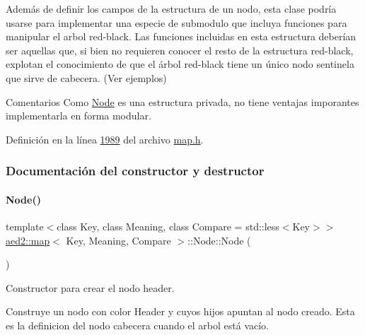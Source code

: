 Además de definir los campos de la estructura de un nodo, esta clase podría usarse para implementar una especie de submodulo que incluya funciones para manipular el arbol red-\/black. Las funciones incluidas en esta estructura deberían ser aquellas que, si bien no requieren conocer el resto de la estructura red-\/black, explotan el conocimiento de que el árbol red-\/black tiene un único nodo sentinela que sirve de cabecera. (Ver ejemplos)

\begin{DoxyRemark}{Comentarios}
Como \hyperlink{structaed2_1_1map_1_1Node}{Node} es una estructura privada, no tiene ventajas imporantes implementarla en forma modular. 
\end{DoxyRemark}


Definición en la línea \hyperlink{map_8h_source_l01989}{1989} del archivo \hyperlink{map_8h_source}{map.\+h}.



\subsubsection{Documentación del constructor y destructor}
\mbox{\label{structaed2_1_1map_1_1Node_a9c1a600491066ce7eb669b1cb76d56c6_a9c1a600491066ce7eb669b1cb76d56c6}} 
\paragraph{\texorpdfstring{Node()}{Node()}\hspace{0.1cm}{\footnotesize\ttfamily [1/2]}}
{\footnotesize\ttfamily template$<$class Key, class Meaning, class Compare = std\+::less$<$\+Key$>$$>$ \\
\hyperlink{classaed2_1_1map}{aed2\+::map}$<$ Key, Meaning, Compare $>$\+::Node\+::\+Node (\begin{DoxyParamCaption}{ }\end{DoxyParamCaption})\hspace{0.3cm}{\ttfamily [inline]}}



Constructor para crear el nodo header. 

Construye un nodo con color Header y cuyos hijos apuntan al nodo creado. Esta es la definicion del nodo cabecera cuando el arbol está vacío.


